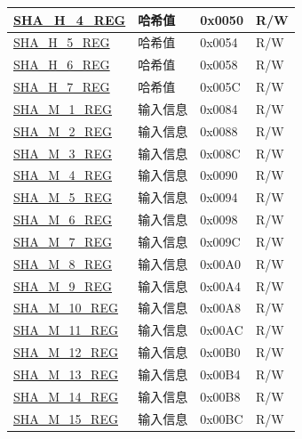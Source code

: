 \begin{longtable}{ | p{6cm} | p{7.2cm} | p{1.3cm} | p{1cm} | }
\hyperref[regdesc:SHAHNREG]{SHA\_H\_4\_REG} & 哈希值 & 0x0050 & R/W \\ \hline
\hyperref[regdesc:SHAHNREG]{SHA\_H\_5\_REG} & 哈希值 & 0x0054 & R/W \\ \hline
\hyperref[regdesc:SHAHNREG]{SHA\_H\_6\_REG} & 哈希值 & 0x0058 & R/W \\ \hline
\hyperref[regdesc:SHAHNREG]{SHA\_H\_7\_REG} & 哈希值 & 0x005C & R/W \\ \hline
\hyperref[regdesc:SHAMNREG]{SHA\_M\_1\_REG} & 输入信息 & 0x0084 & R/W \\ \hline
\hyperref[regdesc:SHAMNREG]{SHA\_M\_2\_REG} & 输入信息 & 0x0088 & R/W \\ \hline
\hyperref[regdesc:SHAMNREG]{SHA\_M\_3\_REG} & 输入信息 & 0x008C & R/W \\ \hline
\hyperref[regdesc:SHAMNREG]{SHA\_M\_4\_REG} & 输入信息 & 0x0090 & R/W \\ \hline
\hyperref[regdesc:SHAMNREG]{SHA\_M\_5\_REG} & 输入信息 & 0x0094 & R/W \\ \hline
\hyperref[regdesc:SHAMNREG]{SHA\_M\_6\_REG} & 输入信息 & 0x0098 & R/W \\ \hline
\hyperref[regdesc:SHAMNREG]{SHA\_M\_7\_REG} & 输入信息 & 0x009C & R/W \\ \hline
\hyperref[regdesc:SHAMNREG]{SHA\_M\_8\_REG} & 输入信息 & 0x00A0 & R/W \\ \hline
\hyperref[regdesc:SHAMNREG]{SHA\_M\_9\_REG} & 输入信息 & 0x00A4 & R/W \\ \hline
\hyperref[regdesc:SHAMNREG]{SHA\_M\_10\_REG} & 输入信息 & 0x00A8 & R/W \\ \hline
\hyperref[regdesc:SHAMNREG]{SHA\_M\_11\_REG} & 输入信息 & 0x00AC & R/W \\ \hline
\hyperref[regdesc:SHAMNREG]{SHA\_M\_12\_REG} & 输入信息 & 0x00B0 & R/W \\ \hline
\hyperref[regdesc:SHAMNREG]{SHA\_M\_13\_REG} & 输入信息 & 0x00B4 & R/W \\ \hline
\hyperref[regdesc:SHAMNREG]{SHA\_M\_14\_REG} & 输入信息 & 0x00B8 & R/W \\ \hline
\hyperref[regdesc:SHAMNREG]{SHA\_M\_15\_REG} & 输入信息 & 0x00BC & R/W \\ \hline
\end{longtable}
